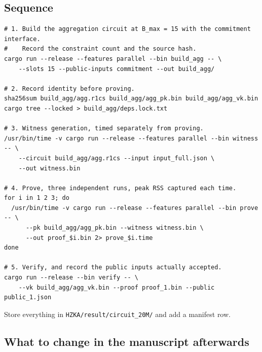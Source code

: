 \documentclass[11pt,a4paper]{article}
\begin{document}
\subsection*{Sequence}

\begin{lstlisting}[caption={Run from the Arkworks harness, not from a fresh Circom build}]
# 1. Build the aggregation circuit at B_max = 15 with the commitment interface.
#    Record the constraint count and the source hash.
cargo run --release --features parallel --bin build_agg -- \
    --slots 15 --public-inputs commitment --out build_agg/

# 2. Record identity before proving.
sha256sum build_agg/agg.r1cs build_agg/agg_pk.bin build_agg/agg_vk.bin
cargo tree --locked > build_agg/deps.lock.txt

# 3. Witness generation, timed separately from proving.
/usr/bin/time -v cargo run --release --features parallel --bin witness -- \
    --circuit build_agg/agg.r1cs --input input_full.json \
    --out witness.bin

# 4. Prove, three independent runs, peak RSS captured each time.
for i in 1 2 3; do
  /usr/bin/time -v cargo run --release --features parallel --bin prove -- \
      --pk build_agg/agg_pk.bin --witness witness.bin \
      --out proof_$i.bin 2> prove_$i.time
done

# 5. Verify, and record the public inputs actually accepted.
cargo run --release --bin verify -- \
    --vk build_agg/agg_vk.bin --proof proof_1.bin --public public_1.json
\end{lstlisting}

Store everything in \texttt{HZKA/result/circuit\_20M/} and add a manifest row.

\subsection*{What to change in the manuscript afterwards}
\end{document}
